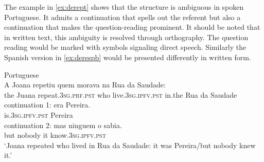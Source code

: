 The example in \eqref{ex:derept} shows that the  structure  is ambiguous in spoken Portuguese. It admits a continuation that spells out the referent but also a continuation that makes the question-reading prominent. It should be noted that in written text, this ambiguity is resolved through orthography. The question reading would be marked with symbols signaling direct speech. Similarly the Spanish version in \eqref{ex:derespb} would be presented differently in written form.

\ea\label{ex:derept}
Portuguese\\ 
\gll
	A Joana repetiu quem morava na Rua da Saudade: \\
the Juana repeat.\textsc{3sg.prf.pst}  who live.\textsc{3sg.ipfv.pst} in.the Rua da Saudade \\
	\exi{}\gll {\ob}continuation 1:{\cb} era  Pereira. \\
{} {}	is.\textsc{3sg.ipfv.pst}  Pereira\\
	\exi{}\gll {\ob}continuation 2:{\cb} mas ninguem o sabia. \\
{} {}	but nobody it know.\textsc{3sg.ipfv.pst}\\
\glt `Joana repeated who lived in Rua da Saudade: it was  Pereira/but nobody knew it.'
\z



